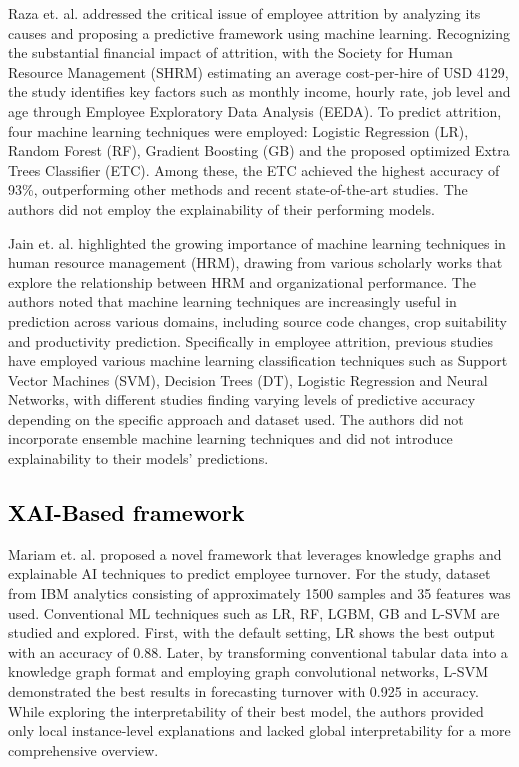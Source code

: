 \documentclass[a4paper,fleqn]{cas-sc}
\begin{document}
Raza et. al. \cite{app12136424} addressed the critical issue of employee attrition by analyzing its causes and proposing a predictive framework using machine learning. Recognizing the substantial financial impact of attrition, with the Society for Human Resource Management (SHRM) estimating an average cost-per-hire of USD 4129, the study identifies key factors such as monthly income, hourly rate, job level and age through Employee Exploratory Data Analysis (EEDA). To predict attrition, four machine learning techniques were employed: Logistic Regression (LR), Random Forest (RF), Gradient Boosting (GB) and the proposed optimized Extra Trees Classifier (ETC). Among these, the ETC achieved the highest accuracy of 93\%, outperforming other methods and recent state-of-the-art studies. The authors did not employ the explainability of their performing models.

Jain et. al. \cite{Jain2020} highlighted the growing importance of machine learning techniques in human resource management (HRM), drawing from various scholarly works that explore the relationship between HRM and organizational performance. The authors noted that machine learning techniques are increasingly useful in prediction across various domains, including source code changes, crop suitability and productivity prediction. Specifically in employee attrition, previous studies have employed various machine learning classification techniques such as Support Vector Machines (SVM), Decision Trees (DT), Logistic Regression and Neural Networks, with different studies finding varying levels of predictive accuracy depending on the specific approach and dataset used. The authors did not incorporate ensemble machine learning techniques and did not introduce explainability to their models’ predictions.

\subsection{\textcolor{black}{XAI-Based framework}}
Mariam et. al. \cite{Akasheh2024} proposed a novel framework that leverages knowledge graphs and explainable AI techniques to predict employee turnover. For the study, dataset from IBM analytics consisting of approximately 1500 samples and 35 features was used. Conventional ML techniques such as LR, RF, LGBM, GB and L-SVM are studied and explored. First, with the default setting, LR shows the best output with an accuracy of 0.88. Later, by transforming conventional tabular data into a knowledge graph format and employing graph convolutional networks, L-SVM demonstrated the best results in forecasting turnover with 0.925 in accuracy. While exploring the interpretability of their best model, the authors provided only local instance-level explanations and lacked global interpretability for a more comprehensive overview. 
\end{document}

